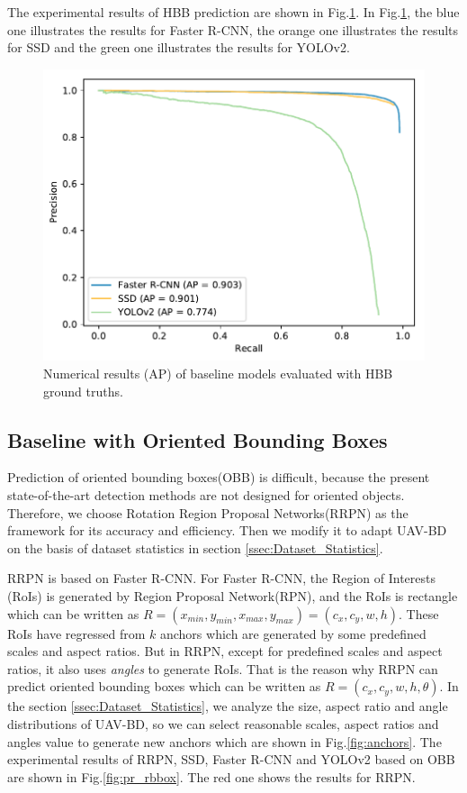 The experimental results of HBB prediction are shown in Fig.\ref{fig:pr_bbox}. In Fig.\ref{fig:pr_bbox}, the blue one illustrates the results for Faster R-CNN, the orange one illustrates the results for SSD and the green one illustrates the results for YOLOv2.


\begin{figure}
	\includegraphics[width=\linewidth]{images/pr_bbox.pdf}
	\caption{Numerical results (AP) of baseline models evaluated with HBB ground truths.}
	\label{fig:pr_bbox}
\end{figure}

\subsection{Baseline with Oriented Bounding Boxes}

Prediction of oriented bounding boxes(OBB) is difficult, because the present state-of-the-art detection methods are not designed for oriented objects. Therefore, we choose Rotation Region Proposal Networks(RRPN)\cite{RRPN} as the framework for its accuracy and efficiency. Then we modify it to adapt UAV-BD on the basis of dataset statistics in section \ref{ssec:Dataset_Statistics}.

RRPN is based on Faster R-CNN. For Faster R-CNN, the Region of Interests (RoIs) is generated by Region Proposal Network(RPN), and the RoIs is rectangle which can be written as $ R = (x_{min}, y_{min}, x_{max}, y_{max}) = (c_x, c_y, w, h) $. These RoIs have regressed from $ k $ anchors which are generated by some predefined scales and aspect ratios. But in RRPN, except for predefined scales and aspect ratios, it also uses \textit{angles} to generate RoIs. That is the reason why RRPN can predict oriented bounding boxes which can be written as $ R=(c_x, c_y, w, h, \theta) $. In the section \ref{ssec:Dataset_Statistics}, we analyze the size, aspect ratio and angle distributions of UAV-BD, so we can select reasonable scales, aspect ratios and angles value to generate new anchors which are shown in Fig.\ref{fig:anchors}. The experimental results of RRPN, SSD, Faster R-CNN and YOLOv2 based on OBB are shown in Fig.\ref{fig:pr_rbbox}. The red one shows the results for RRPN.



